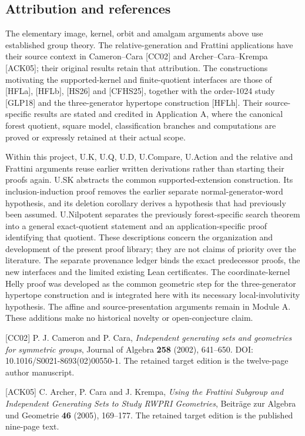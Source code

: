 \documentclass[
  11pt,
  a4paper,
]{article}
\begin{document}
\subsection{Attribution and
references}\label{attribution-and-references}

The elementary image, kernel, orbit and amalgam arguments above use
established group theory. The relative-generation and Frattini
applications have their source context in Cameron--Cara {[}CC02{]} and
Archer--Cara--Krempa {[}ACK05{]}; their original results retain that
attribution. The constructions motivating the supported-kernel and
finite-quotient interfaces are those of {[}HFLa{]}, {[}HFLb{]},
{[}HS26{]} and {[}CFHS25{]}, together with the order-1024 study
{[}GLP18{]} and the three-generator hypertope construction {[}HFLh{]}.
Their source-specific results are stated and credited in Application A,
where the canonical forest quotient, square model, classification
branches and computations are proved or expressly retained at their
actual scope.

Within this project, U.K, U.Q, U.D, U.Compare, U.Action and the relative
and Frattini arguments reuse earlier written derivations rather than
starting their proofs again. U.SK abstracts the common
supported-extension construction. Its inclusion-induction proof removes
the earlier separate normal-generator-word hypothesis, and its deletion
corollary derives a hypothesis that had previously been assumed.
U.Nilpotent separates the previously forest-specific search theorem into
a general exact-quotient statement and an application-specific proof
identifying that quotient. These descriptions concern the organization
and development of the present proof library; they are not claims of
priority over the literature. The separate provenance ledger binds the
exact predecessor proofs, the new interfaces and the limited existing
Lean certificates. The coordinate-kernel Helly proof was developed as
the common geometric step for the three-generator hypertope construction
and is integrated here with its necessary local-involutivity hypothesis.
The affine and source-presentation arguments remain in Module A. These
additions make no historical novelty or open-conjecture claim.

{[}CC02{]} P. J. Cameron and P. Cara, \emph{Independent generating sets
and geometries for symmetric groups}, Journal of Algebra \textbf{258}
(2002), 641--650. DOI: 10.1016/S0021-8693(02)00550-1. The retained
target edition is the twelve-page author manuscript.

{[}ACK05{]} C. Archer, P. Cara and J. Krempa, \emph{Using the Frattini
Subgroup and Independent Generating Sets to Study RWPRI Geometries},
Beiträge zur Algebra und Geometrie \textbf{46} (2005), 169--177. The
retained target edition is the published nine-page text.
\end{document}
